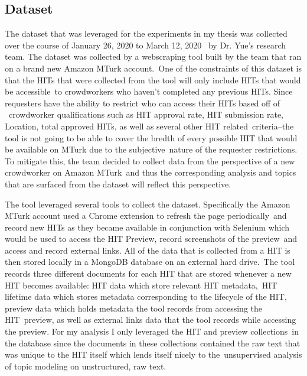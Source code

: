 \documentclass[letterpaper,12pt]{article}
\begin{document}
\subsection{Dataset}
The dataset that was leveraged for the experiments in my thesis was collected over the course of January 26, 2020 to March 12, 2020 \
by Dr. Yue's research team. The dataset was collected by a webscraping tool built by the team that ran on a brand new Amazon MTurk account.\
One of the constraints of this dataset is that the HITs that were collected from the tool will only include HITs that would be accessible\
to crowdworkers who haven't completed any previous HITs. Since requesters have the ability to restrict who can access their HITs based off of \
crowdworker qualifications such as HIT approval rate, HIT submission rate, Location, total approved HITs, as well as several other HIT related\
criteria--the tool is not going to be able to cover the bredth of every possible HIT that would be available on MTurk due to the subjective\
nature of the requester restrictions. To mitigate this, the team decided to collect data from the perspective of a new crowdworker on Amazon MTurk\
and thus the corresponding analysis and topics that are surfaced from the dataset will reflect this perspective.

The tool leveraged several tools to collect the dataset. Specifically the Amazon MTurk account used a Chrome extension to refresh the page periodically\
and record new HITs as they became available in conjunction with Selenium which would be used to access the HIT Preview, record screenshots of the preview\
and access and record external links. All of the data that is collected from a HIT is then stored locally in a MongoDB database on an external hard drive.\
The tool records three different documents for each HIT that are stored whenever a new HIT becomes available: HIT data which store relevant HIT metadata,\
HIT lifetime data which stores metadata corresponding to the lifecycle of the HIT, preview data which holds metadata the tool records from accessing the HIT\
preview, as well as external links data that the tool records while accessing the preview. For my analysis I only leveraged the HIT and preview collections\
in the database since the documents in these collections contained the raw text that was unique to the HIT itself which lends itself nicely to the\
unsupervised analysis of topic modeling on unstructured, raw text.
\end{document}
